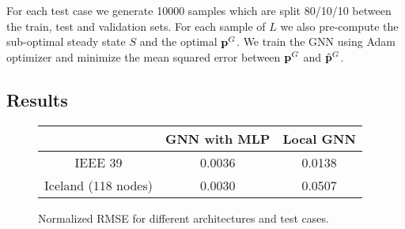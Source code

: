 \documentclass[conference,9pt]{IEEEtran}
\begin{document}
	For each test case we generate 10000 samples which are split 80/10/10 between the train, test and validation sets. For each sample of $L$ we also pre-compute the sub-optimal steady state $S$ and the optimal ${\mathbf p}^G$. We train the GNN using Adam optimizer and minimize the mean squared error between ${\mathbf p}^G$ and ${\hat{\mathbf p} }^G$.
	
	\subsection{Results}
	
	\begin{figure}
		\centering
		\begin{tabular}{|c|c|c|}
			\hline 
			& GNN with MLP & Local GNN \\ 
			\hline 
			IEEE 39 & 0.0036 & 0.0138 \\ 
			\hline 
			Iceland (118 nodes) & 0.0030 & 0.0507 \\ 
			\hline 
		\end{tabular} 
		\caption{Normalized RMSE for different architectures and test cases.}
	\end{figure}
	
	\printbibliography
\end{document}
